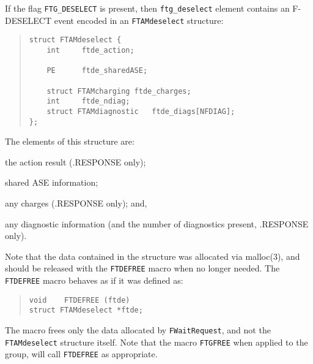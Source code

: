 If the flag \verb"FTG_DESELECT" is present,
then \verb"ftg_deselect" element contains an {\sf F-DESELECT\/} event encoded in an
\verb"FTAMdeselect" structure:
\begin{quote}\small\begin{verbatim}
struct FTAMdeselect {
    int     ftde_action;

    PE      ftde_sharedASE;

    struct FTAMcharging ftde_charges;
    int     ftde_ndiag;
    struct FTAMdiagnostic   ftde_diags[NFDIAG];
};
\end{verbatim}\end{quote}
The elements of this structure are:
\begin{describe}
\item[\verb"ftde\_action":] the action result ({\sf .RESPONSE\/} only);

\item[\verb"ftde\_sharedASE":] shared ASE information;

\item[\verb"ftde\_charges":] any charges ({\sf .RESPONSE\/} only);
and,

\item[\verb"ftde\_diags"/\verb"ftde\_ndiag":] any diagnostic information
(and the number of diagnostics present, {\sf .RESPONSE\/} only).
\end{describe}
Note that the data contained in the structure was allocated via \man malloc(3),
and should be released with the \verb"FTDEFREE" macro when no longer needed.
The \verb"FTDEFREE" macro
behaves as if it was defined as:
\begin{quote}\small\begin{verbatim}
void    FTDEFREE (ftde)
struct FTAMdeselect *ftde;
\end{verbatim}\end{quote}
The macro frees only the data allocated by \verb"FWaitRequest",
and not the \verb"FTAMdeselect" structure itself.
Note that the macro \verb"FTGFREE" when applied to the group,
will call \verb"FTDEFREE" as appropriate.

